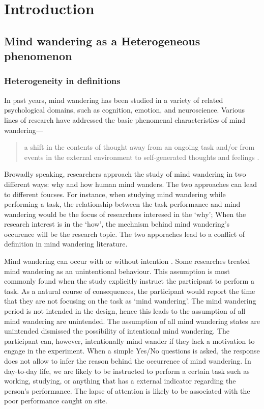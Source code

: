\chapter{Introduction}
\label{ch:intro}

\newpage

\section{Mind wandering as a Heterogeneous phenomenon}

\subsection{Heterogeneity in definitions}
In past years, mind wandering has been studied in a variety of related psychological domains, such as cognition, emotion, and neuroscience. Various lines of research have addressed the basic phenomenal characteristics of mind wandering---
\begin{quote}
    a shift in the contents of thought away from an ongoing task and/or from events in the external environment to self-generated thoughts and feelings \cite{SmallwoodSchooler2006,SmallwoodSchooler2015}.
\end{quote}
Browadly speaking, researchers approach the study of mind wandering in two different ways: why and how human mind wanders. The two approaches can lead to different foucses. For instance, when studying mind wandering while performing a task, the relationship between the task performance and mind wandering would be the focus of researchers interesed in the `why'; When the research interest is in the `how', the mechnism behind mind wandering's occurence will be the research topic. The two apporaches lead to a conflict of definition in mind wandering literature.

Mind wandering can occur with or without intention \cite{SeliTiCS2016}. Some researches treated mind wandering as an unintentional behaviour. This assumption is most commonly found when the study explicitly instruct the participant to perform a task. As a natural course of consequences, the participant would report the time that they are not focusing on the task as `mind wandering'. The mind wandering period is not intended in the design, hence this leads to the assumption of all mind wandering are unintended. The assumption of all mind wandering states are unintended dismissed the possibility of intentional mind wandering. The participant can, however, intentionally mind wander if they lack a motivation to engage in the experiment. When a simple Yes/No questions is asked, the response does not allow to infer the reason behind the occurrence of mind wandering. In day-to-day life, we are likely to be instructed to perform a certain task such as working, studying, or anything that has a external indicator regarding the person's performance. The lapse of attention is likely to be associated with the poor performance caught on site.

